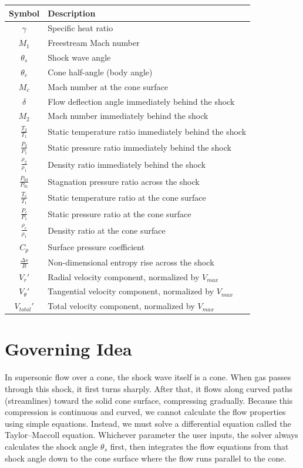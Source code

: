 \begin{center}
\begin{tabular}{@{}cl@{}}
\toprule
Symbol & Description \\
\midrule
$\gamma$ & Specific heat ratio \\
$M_1$ & Freestream Mach number \\
$\theta_s$ & Shock wave angle \\
$\theta_c$ & Cone half-angle (body angle) \\
$M_c$ & Mach number at the cone surface \\
$\delta$ & Flow deflection angle immediately behind the shock \\
$M_2$ & Mach number immediately behind the shock \\
$\frac{T_2}{T_1}$ & Static temperature ratio immediately behind the shock \\
$\frac{P_2}{P_1}$ & Static pressure ratio immediately behind the shock \\
$\frac{\rho_2}{\rho_1}$ & Density ratio immediately behind the shock \\
$\frac{P_{02}}{P_{01}}$ & Stagnation pressure ratio across the shock \\
$\frac{T_c}{T_1}$ & Static temperature ratio at the cone surface \\
$\frac{P_c}{P_1}$ & Static pressure ratio at the cone surface \\
$\frac{\rho_c}{\rho_1}$ & Density ratio at the cone surface \\
$C_p$ & Surface pressure coefficient \\
$\frac{\Delta s}{R}$ & Non-dimensional entropy rise across the shock \\
$V_r'$ & Radial velocity component, normalized by $V_{max}$ \\
$V_\theta'$ & Tangential velocity component, normalized by $V_{max}$ \\
$V_{total}'$ & Total velocity component, normalized by $V_{max}$ \\
\bottomrule
\end{tabular}
\end{center}

\section{Governing Idea}

In supersonic flow over a cone, the shock wave itself is a cone. When gas passes through this shock, it first turns sharply. After that, it flows along curved paths (streamlines) toward the solid cone surface, compressing gradually. Because this compression is continuous and curved, we cannot calculate the flow properties using simple equations. Instead, we must solve a differential equation called the Taylor--Maccoll equation. Whichever parameter the user inputs, the solver always calculates the shock angle $\theta_s$ first, then integrates the flow equations from that shock angle down to the cone surface where the flow runs parallel to the cone.

